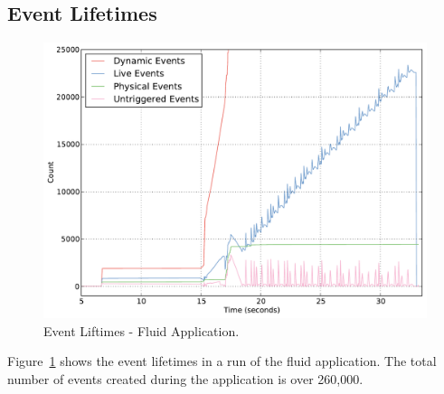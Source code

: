 \subsection{Event Lifetimes}
\label{subsec:eventlife}

\begin{figure}
\begin{center}
\includegraphics[scale=0.33]{figs/event_lifetimes.pdf}
\end{center}
\vspace{-6mm}
\caption{Event Liftimes - Fluid Application.\label{fig:eventlife}}
\vspace{-4mm}
\end{figure}

Figure~\ref{fig:eventlife} shows the event lifetimes in a run of the fluid application.  The total number
of events created during the application is over 260,000.

